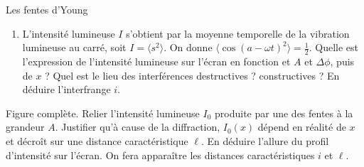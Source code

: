 \begin{exo}[MPSI]{Les fentes d'Young}
\begin{quest}
\begin{enumerate}[label=\alph{*})]
\item L'intensité lumineuse $I$ s'obtient par la moyenne temporelle de la vibration lumineuse au carré, soit $I=\langle s^2 \rangle$. On donne $\langle \cos(a-\omega t)^2\rangle = \frac{1}{2}$. Quelle est l'expression de l'intensité lumineuse sur l'écran en fonction et $A$ et $\Delta \phi$, puis de $x$ ? Quel est le lieu des interférences destructives ? constructives ?  En déduire l'interfrange $i$.



\end{enumerate}

\item Figure complète. Relier l'intensité lumineuse $I_0$ produite par une des fentes à la grandeur $A$. Justifier qu'à cause de la diffraction, $I_0(x)$ dépend en réalité de $x$ et décroît sur une distance caractéristique $\ell$. En déduire l'allure du profil d'intensité sur l'écran. On fera apparaître les distances caractéristiques $i$ et $\ell$.


\end{quest}
\end{exo}


